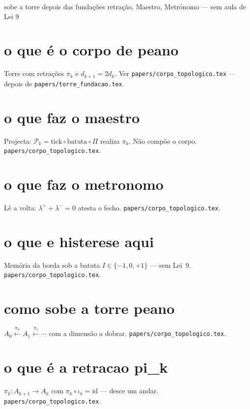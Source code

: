 \documentclass[11pt,a4paper]{article}
\newcommand{\code}[1]{\texttt{\small #1}}
\begin{document}
       {sobe a torre depois das fundações}
       {retração, Maestro, Metrónomo --- sem aula de Lei 9}
\maketitle
\begin{abstract}
Pares curtos para o próximo andar da escada.
Fundação primeiro: \code{papers/torre\_fundacao.tex}.
Detalhe: \code{papers/corpo\_topologico.tex}.
\end{abstract}

\section{o que é o corpo de peano}
Torre com retrações $\pi_k$ e $d_{k+1}=2d_k$.
Ver \code{papers/corpo\_topologico.tex} --- depois de \code{papers/torre\_fundacao.tex}.

\section{o que faz o maestro}
Projecta: $\mathcal{P}_k=\mathrm{tick}\circ\mathrm{batuta}\circ\Pi$ realiza $\pi_k$.
Não compõe o corpo. \code{papers/corpo\_topologico.tex}.

\section{o que faz o metronomo}
Lê a volta: $\lambda^{+}+\lambda^{-}=0$ atesta o fecho.
\code{papers/corpo\_topologico.tex}.

\section{o que e histerese aqui}
Memória da borda sob a batuta $I\in\{-1,0,+1\}$ --- sem Lei~9.
\code{papers/corpo\_topologico.tex}.

\section{como sobe a torre peano}
$A_0\xleftarrow{\pi_0}A_1\xleftarrow{\pi_1}\cdots$ com a dimensão a dobrar.
\code{papers/corpo\_topologico.tex}.

\section{o que é a retracao pi\_k}
$\pi_k\colon A_{k+1}\to A_k$ com $\pi_k\circ\iota_k=\mathrm{id}$ --- desce um andar.
\code{papers/corpo\_topologico.tex}.
\end{document}
